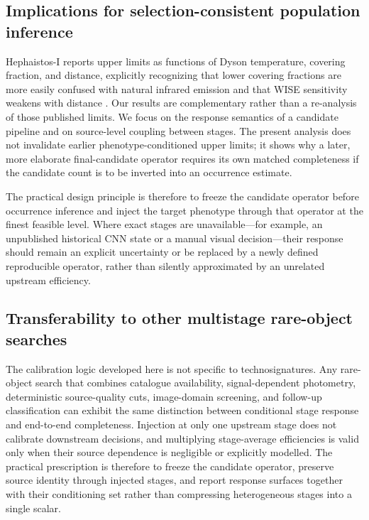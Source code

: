 \documentclass[fleqn,usenatbib]{mnras}
\begin{document}
\subsection{Implications for selection-consistent population inference}

Hephaistos-I reports upper limits as functions of Dyson temperature, covering fraction, and distance, explicitly recognizing that lower covering fractions are more easily confused with natural infrared emission and that WISE sensitivity weakens with distance \citep{Suazo2022}. Our results are complementary rather than a re-analysis of those published limits. We focus on the response semantics of a candidate pipeline and on source-level coupling between stages. The present analysis does not invalidate earlier phenotype-conditioned upper limits; it shows why a later, more elaborate final-candidate operator requires its own matched completeness if the candidate count is to be inverted into an occurrence estimate.

The practical design principle is therefore to freeze the candidate operator before occurrence inference and inject the target phenotype through that operator at the finest feasible level. Where exact stages are unavailable---for example, an unpublished historical CNN state or a manual visual decision---their response should remain an explicit uncertainty or be replaced by a newly defined reproducible operator, rather than silently approximated by an unrelated upstream efficiency.

\subsection{Transferability to other multistage rare-object searches}

The calibration logic developed here is not specific to technosignatures. Any rare-object search that combines catalogue availability, signal-dependent photometry, deterministic source-quality cuts, image-domain screening, and follow-up classification can exhibit the same distinction between conditional stage response and end-to-end completeness. Injection at only one upstream stage does not calibrate downstream decisions, and multiplying stage-average efficiencies is valid only when their source dependence is negligible or explicitly modelled. The practical prescription is therefore to freeze the candidate operator, preserve source identity through injected stages, and report response surfaces together with their conditioning set rather than compressing heterogeneous stages into a single scalar.
\end{document}
